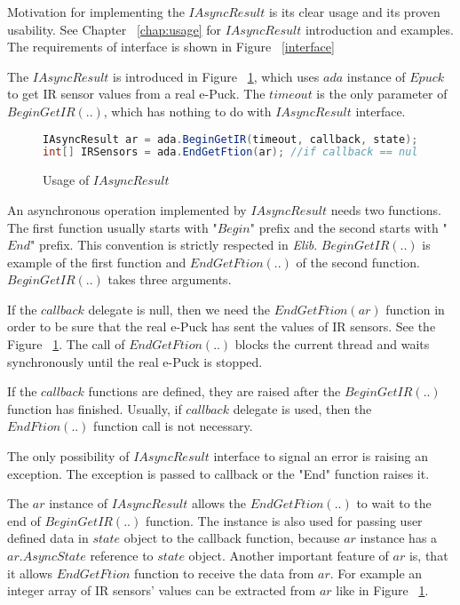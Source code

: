 	Motivation for implementing the $IAsyncResult$ is its clear usage and its proven usability.
	See Chapter ~\ref{chap:usage} for $IAsyncResult$ introduction and examples.
	The requirements of interface is shown in Figure ~\ref{interface}

	The $IAsyncResult$ is introduced in Figure ~\ref{arexample}, which uses $ada$ instance
	of $Epuck$ to get IR sensor values from a real e-Puck. The $timeout$ is the only parameter of $BeginGetIR(..)$,
	which has nothing to do with $IAsyncResult$ interface.

\begin{figure}[!hbp]
\begin{lstlisting}[language=cs]
IAsyncResult ar = ada.BeginGetIR(timeout, callback, state);            
int[] IRSensors = ada.EndGetFtion(ar); //if callback == null
\end{lstlisting}
\caption{Usage of $IAsyncResult$}\label{arexample}
\end{figure}

	An asynchronous operation implemented by $IAsyncResult$ needs two functions. The first function usually starts with 
	"$Begin$" prefix and the second starts with "$End$" prefix. This convention is strictly respected in {\it Elib}.
	$BeginGetIR(..)$ is example of the first function and $EndGetFtion(..)$ of the second function.
	$BeginGetIR(..)$ takes three arguments. 

	If the $callback$ delegate is null, then we need the $EndGetFtion(ar)$ function
	in order to be sure that the real e-Puck has sent the values of IR sensors. 
	See the Figure ~\ref{arexample}.
	The call of $EndGetFtion(..)$ blocks the current thread and waits synchronously until the real
	e-Puck is stopped.

	If the $callback$ functions are defined, they are raised after the $BeginGetIR(..)$ function has finished.
	Usually, if $callback$ delegate is used, then the $EndFtion(..)$ function call is not necessary.

	The only possibility of $IAsyncResult$ interface to signal an error is raising an exception.
	The exception is passed to callback or the "End" function raises it.

	The $ar$ instance of $IAsyncResult$ allows the $EndGetFtion(..)$ to wait to the end of $BeginGetIR(..)$ function.
	The instance is also used for passing user defined data in $state$ object to the callback function,
	because $ar$ instance has a $ar.AsyncState$ reference to $state$ object.
	Another important feature of $ar$ is, that it allows $EndGetFtion$ function to receive the data
	from $ar$. For example an integer array of IR sensors' values can be extracted from $ar$ like in Figure ~\ref{arexample}.
	

